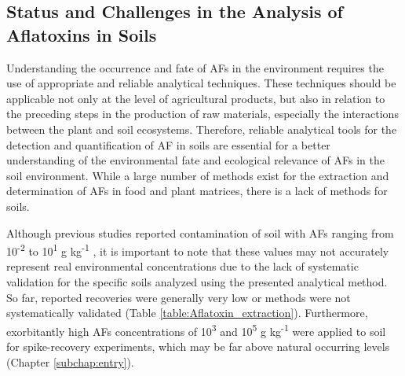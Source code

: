\subsection{Status and Challenges in the Analysis of Aflatoxins in Soils} \label{subchap:analysis}

Understanding the occurrence and fate of AFs in the environment requires the use of appropriate and reliable analytical techniques. These techniques should be applicable not only at the level of agricultural products, but also in relation to the preceding steps in the production of raw materials, especially the interactions between the plant and soil ecosystems. Therefore, reliable analytical tools for the detection and quantification of AF in soils are essential for a better understanding of the environmental fate and ecological relevance of AFs in the soil environment. While a large number of methods exist for the extraction and determination of AFs in food and plant matrices, there is a lack of methods for soils. 


Although previous studies reported contamination of soil with AFs ranging from 10\textsuperscript{-2} to 10\textsuperscript{1} \textmu g kg\textsuperscript{-1} \citep{accinelli2008aspergillus}, it is important to note that these values may not accurately represent real environmental concentrations due to the lack of systematic validation for the specific soils analyzed using the presented analytical method. So far, reported recoveries were generally very low or methods were not systematically validated (Table \ref{table:Aflatoxin_extraction}). Furthermore, exorbitantly high AFs concentrations of 10\textsuperscript{3} and 10\textsuperscript{5} \textmu g kg\textsuperscript{-1} were applied to soil for spike-recovery experiments, which may be far above natural occurring levels (Chapter \ref{subchap:entry}). 

 


